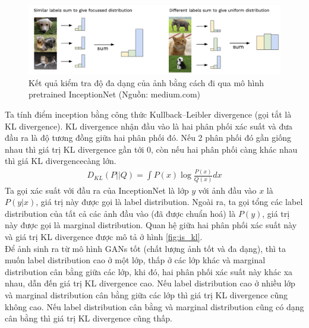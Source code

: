 {    \begin{figure}[H]
    \centering
    \includegraphics[width=13cm] {images/inception_3.png}
    \caption{Kết quả kiểm tra độ đa dạng của ảnh bằng cách đi qua mô hình pretrained InceptionNet (Nguồn: medium.com)}
    \label{fig:inception_1}
    \end{figure}
    \noindent Ta tính điểm inception bằng công thức Kullback–Leibler divergence (gọi tắt là KL divergence). KL divergence nhận đầu vào là hai phân phối xác suất và đưa đầu ra là độ tương đồng giữa hai phân phối đó. Nếu 2 phân phối đó gần giống nhau thì giá trị KL divergence gần tới 0, còn nếu hai phân phối càng khác nhau thì giá KL divergencecàng lớn.
    \begin{align}
        D_{KL}(P||Q) = \int P(x) \log \frac {P(x)}{Q(x)}dx
    \end{align}
    Ta gọi xác suất với đầu ra của InceptionNet là lớp $y$ với ảnh đầu vào $x$ là $P(y|x)$, giá trị này được gọi là label distribution. Ngoài ra, ta gọi tổng các label distribution của tất cả các ảnh đầu vào (đã được chuẩn hoá) là $P(y)$, giá trị này được gọi là marginal distribution. Quan hệ giữa hai phân phối xác suất này và giá trị KL divergence được mô tả ở hình \ref{fig:is_kl}.\\
    Để ảnh sinh ra từ mô hình GANs tốt (chất lượng ảnh tốt và đa dạng), thì ta muốn label distribution cao ở một lớp, thấp ở các lớp khác và marginal distribution cân bằng giữa các lớp, khi đó, hai phân phối xác suất này khác xa nhau, dẫn đến giá trị KL divergence cao. Nếu label distribution cao ở nhiều lớp và marginal distribution cân bằng giữa các lớp thì giá trị KL divergence cũng không cao. Nếu label distribution cân bằng và marginal distribution cũng có dạng cân bằng thì giá trị KL divergence cũng thấp.\\
}

